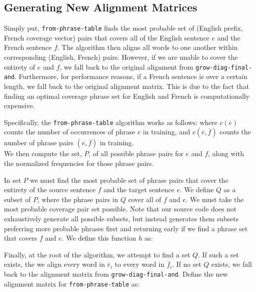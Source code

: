\documentclass[twocolumn]{article}
\newcommand{\originalAlign}{\texttt{grow-diag-final-and}}
\newcommand{\phraseAlign}{\texttt{from-phrase-table}}
\begin{document}


\subsection{Generating New Alignment Matrices}
Simply put, \phraseAlign{} finds the most probable set of
(English prefix, French coverage vector) pairs that covers all of the English
sentence $e$ and the French sentence $f$. The algorithm then aligns all words to
one another within corresponding (English, French) pairs. However, if we are
unable to cover the entirety of $e$ and $f$, we fall back to the original
alignment from \originalAlign{}. Furthermore, for performance reasons, if a
French sentence is over a certain length, we fall back to the original alignment
matrix. This is due to the fact that finding an optimal coverage phrase set for
English and French is computationally expensive.

Specifically, the \phraseAlign{} algorithm works as follows:
\wrapSmall{\[ \phrasePairNorm{} \]}
where $c(\overline{e})$ counts the number of occurrences of phrase
$\overline{e}$ in training,
and $c(\overline{e},\overline{f})$ counts the number of phrase pairs
$(\overline{e},\overline{f})$ in training. \\

We then compute the set, $P$, of all possible phrase pairs for $e$ and $f$,
along with the normalized frequencies for those phrase pairs.
\wrapSmall{\allPhrasePairs{}}

In set $P$ we must find the most probable set of phrase pairs that cover the
entirety of the source sentence $f$ and the target sentence $e$. We define $Q$
as a subset of $P$, where the phrase pairs in $Q$ cover all of $f$ and $e$.
We must take the most probable coverage pair set possible. Note that our source
code does not exhaustively generate all possible subsets, but instead generates
them subsets preferring more probable phrases first and returning early if we
find a phrase set that covers $f$ and $e$. We define this function $h$ as:
\wrapSmall{\optPhraseCoverage{}}

Finally, at the root of the algorithm, we attempt to find a set $Q$. If such a
set exists, the we align every word in $\overline{e}_i$ to every word in
$\overline{f}_i$. If no set $Q$ exists, we fall back to the alignment matrix
from \originalAlign{}. Define the new alignment matrix for \phraseAlign{} as:
\wrapSmall{\growPhraseMatrix{}}
\end{document}
